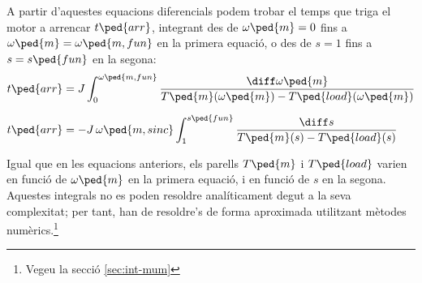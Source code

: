 A partir d'aquestes equacions diferencials podem trobar el temps que triga el motor a arrencar $t\ped{arr}$, integrant des de $\omega\ped{m}=0$ fins a $\omega\ped{m}=\omega\ped{m,fun}$ en la primera equació, o des de $s = 1$ fins a $s = s\ped{fun}$ en la segona:
\begin{subequations}
\begin{align}
    t\ped{arr} &= J\int_{0}^{\omega\ped{m,fun}} \frac{\diff\omega\ped{m}}{T\ped{m}(\omega\ped{m})-T\ped{load}(\omega\ped{m})}\label{eq:tarr-mot}\\[1.5ex]
    t\ped{arr} &= - J\,\omega\ped{m,sinc} \int_{1}^{s\ped{fun}} \frac{\diff s}{T\ped{m}(s)-T\ped{load}(s)}
\end{align}
\end{subequations}

Igual que en les equacions anteriors, els parells $T\ped{m}$ i $T\ped{load}$ varien en funció de $\omega\ped{m}$ en la primera equació, i en funció de $s$ en la segona. Aquestes integrals no es poden  resoldre  analíticament degut a la seva complexitat; per tant,  han de resoldre's de forma aproximada utilitzant mètodes numèrics.\footnote{Vegeu la secció \ref{sec:int-mum}}



